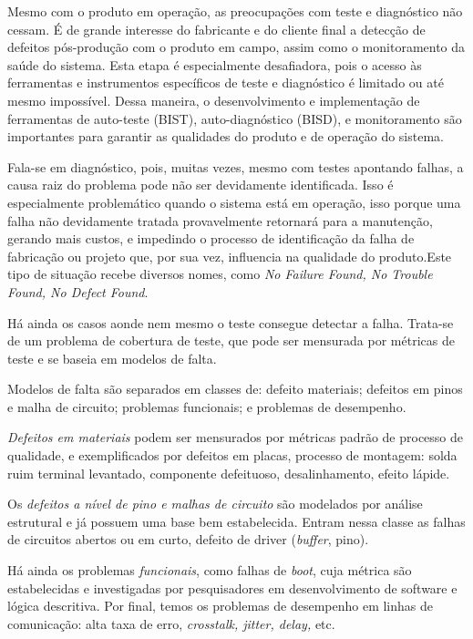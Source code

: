 Mesmo com o produto em operação, as preocupações com teste e diagnóstico não cessam. É de grande interesse do fabricante e do cliente final a detecção de defeitos pós-produção com o produto em campo, assim como o monitoramento da saúde do sistema. Esta etapa é especialmente desafiadora, pois o acesso às ferramentas e instrumentos específicos de teste e diagnóstico é limitado ou até mesmo impossível. Dessa maneira, o desenvolvimento e implementação de ferramentas de auto-teste (BIST), auto-diagnóstico (BISD), e monitoramento são importantes para garantir as qualidades do produto e de operação do sistema.

Fala-se em diagnóstico, pois, muitas vezes, mesmo com testes apontando falhas, a causa raiz do problema pode não ser devidamente identificada. Isso é especialmente problemático quando o sistema está em operação, isso porque uma falha não devidamente tratada provavelmente retornará para a manutenção, gerando mais custos, e impedindo o processo de identificação da falha de fabricação ou projeto que, por sua vez, influencia na qualidade do produto.Este tipo de situação recebe diversos nomes, como \textit{No Failure Found, No Trouble Found, No Defect Found}.

Há ainda os casos aonde nem mesmo o teste consegue detectar a falha. Trata-se de um problema de cobertura de teste, que pode ser mensurada por métricas de teste e se baseia em modelos de falta.

Modelos de falta são separados em classes de: defeito materiais; defeitos em pinos e malha de circuito; problemas funcionais; e problemas de desempenho. 

\textit{Defeitos em materiais}  podem ser mensurados por métricas padrão de processo de qualidade, e exemplificados por defeitos em placas, processo de montagem: solda ruim terminal levantado, componente defeituoso, desalinhamento, efeito lápide.

Os \textit{defeitos a nível de pino e malhas de circuito} são modelados por análise estrutural e já possuem uma base bem estabelecida. Entram nessa classe as falhas de circuitos abertos ou em curto, defeito de driver (\textit{buffer}, pino).

Há ainda os problemas \textit{funcionais}, como falhas de \textit{boot}, cuja métrica são estabelecidas e investigadas por pesquisadores em desenvolvimento de software e lógica descritiva.
Por final, temos os problemas de desempenho em linhas de comunicação: alta taxa de erro, \textit{crosstalk, jitter, delay,} etc.

